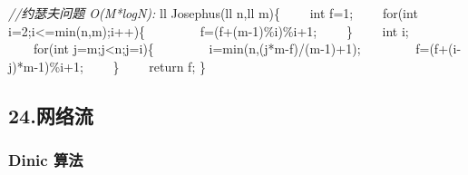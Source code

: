 \documentclass[
]{article}
\newenvironment{Shaded}{}{}
\newcommand{\CommentTok}[1]{\textcolor[rgb]{0.38,0.63,0.69}{\textit{#1}}}
\newcommand{\DataTypeTok}[1]{\textcolor[rgb]{0.56,0.13,0.00}{#1}}
\newcommand{\DecValTok}[1]{\textcolor[rgb]{0.25,0.63,0.44}{#1}}
\newcommand{\NormalTok}[1]{#1}
\newcommand{\OperatorTok}[1]{\textcolor[rgb]{0.40,0.40,0.40}{#1}}
\begin{document}
\begin{Shaded}
\begin{Highlighting}[]
\CommentTok{//约瑟夫问题 O(M*logN):}
\NormalTok{ll Josephus}\OperatorTok{(}\NormalTok{ll n}\OperatorTok{,}\NormalTok{ll m}\OperatorTok{)\{}
\NormalTok{    int f}\OperatorTok{=}\DecValTok{1}\OperatorTok{;}
\NormalTok{    for}\OperatorTok{(}\DataTypeTok{int}\NormalTok{ i}\OperatorTok{=}\DecValTok{2}\OperatorTok{;}\NormalTok{i}\OperatorTok{\textless{}=}\NormalTok{min}\OperatorTok{(}\NormalTok{n}\OperatorTok{,}\NormalTok{m}\OperatorTok{);}\NormalTok{i}\OperatorTok{++)\{}
\NormalTok{        f}\OperatorTok{=(}\NormalTok{f}\OperatorTok{+(}\NormalTok{m}\OperatorTok{{-}}\DecValTok{1}\OperatorTok{)\%}\NormalTok{i}\OperatorTok{)\%}\NormalTok{i}\OperatorTok{+}\DecValTok{1}\OperatorTok{;}
    \OperatorTok{\}}
\NormalTok{    int i}\OperatorTok{;}
\NormalTok{    for}\OperatorTok{(}\DataTypeTok{int}\NormalTok{ j}\OperatorTok{=}\NormalTok{m}\OperatorTok{;}\NormalTok{j}\OperatorTok{\textless{}}\NormalTok{n}\OperatorTok{;}\NormalTok{j}\OperatorTok{=}\NormalTok{i}\OperatorTok{)\{}
\NormalTok{        i}\OperatorTok{=}\NormalTok{min}\OperatorTok{(}\NormalTok{n}\OperatorTok{,(}\NormalTok{j}\OperatorTok{*}\NormalTok{m}\OperatorTok{{-}}\NormalTok{f}\OperatorTok{)/(}\NormalTok{m}\OperatorTok{{-}}\DecValTok{1}\OperatorTok{)+}\DecValTok{1}\OperatorTok{);}
\NormalTok{        f}\OperatorTok{=(}\NormalTok{f}\OperatorTok{+(}\NormalTok{i}\OperatorTok{{-}}\NormalTok{j}\OperatorTok{)*}\NormalTok{m}\OperatorTok{{-}}\DecValTok{1}\OperatorTok{)\%}\NormalTok{i}\OperatorTok{+}\DecValTok{1}\OperatorTok{;}
    \OperatorTok{\}}
\NormalTok{    return f}\OperatorTok{;}
\OperatorTok{\}}
\end{Highlighting}
\end{Shaded}

\hypertarget{24ux7f51ux7edcux6d41}{%
\subsection{24.网络流}\label{24ux7f51ux7edcux6d41}}

\hypertarget{dinic-ux7b97ux6cd5}{%
\subsubsection{Dinic 算法}\label{dinic-ux7b97ux6cd5}}
\end{document}
